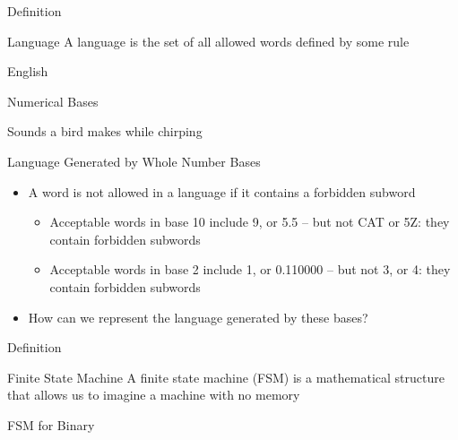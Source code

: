 \documentclass{beamer}
\begin{document}
\begin{frame}{Definition}
  \begin{block}{Language}
    A language is the set of all allowed words defined by some rule
  \end{block}\pause

  \begin{example}
    English \pause

    Numerical Bases \pause

    Sounds a bird makes while chirping
  \end{example}
\end{frame}

\begin{frame}{Language Generated by Whole Number Bases}
  \begin{itemize}
    \item A word is not allowed in a language if it contains a forbidden subword
    \begin{itemize}
      \item Acceptable words in base 10 include 9, or 5.5 -- but not CAT or 5Z: they contain forbidden subwords
      \item Acceptable words in base 2 include 1, or 0.110000 -- but not 3, or 4: they contain forbidden subwords
    \end{itemize}\pause
    \item How can we represent the language generated by these bases?
  \end{itemize}
\end{frame}

\begin{frame}{Definition}
  \begin{block}{Finite State Machine}
    A finite state machine (FSM) is a mathematical structure that allows us to imagine a machine with no memory
  \end{block}
\end{frame}

\begin{frame}{FSM for Binary}
  \begin{center}
  \end{center}
\end{frame}
\end{document}
